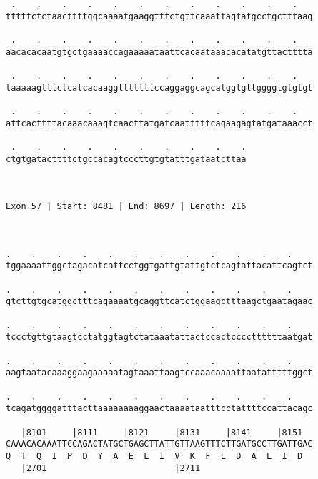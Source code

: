 \documentclass{article}
\begin{document}
\begin{Verbatim}
 .    .    .    .    .    .    .    .    .    .    .    .   
tttttctctaacttttggcaaaatgaaggtttctgttcaaattagtatgcctgctttaag
                                                            
 .    .    .    .    .    .    .    .    .    .    .    .   
aacacacaatgtgctgaaaaccagaaaaataattcacaataaacacatatgttactttta
                                                            
 .    .    .    .    .    .    .    .    .    .    .    .   
taaaaagtttctcatcacaaggtttttttccaggaggcagcatggtgttggggtgtgtgt
                                                            
 .    .    .    .    .    .    .    .    .    .    .    .   
attcacttttacaaacaaagtcaacttatgatcaatttttcagaagagtatgataaacct
                                                            
 .    .    .    .    .    .    .    .    .    .
ctgtgatacttttctgccacagtcccttgtgtatttgataatcttaa
                                               
                                               
 
Exon 57 | Start: 8481 | End: 8697 | Length: 216



.    .    .    .    .    .    .    .    .    .    .    .    
tggaaaattggctagacatcattcctggtgattgtattgtctcagtattacattcagtct
                                                            
.    .    .    .    .    .    .    .    .    .    .    .    
gtcttgtgcatggctttcagaaaatgcaggttcatctggaagctttaagctgaatagaac
                                                            
.    .    .    .    .    .    .    .    .    .    .    .    
tccctgttgtaagtcctatggtagtctataaatattactccactccccttttttaatgat
                                                            
.    .    .    .    .    .    .    .    .    .    .    .    
aagtaatacaaaggaagaaaaatagtaaattaagtccaaacaaaattaatatttttggct
                                                            
.    .    .    .    .    .    .    .    .    .    .    .    
tcagatggggatttacttaaaaaaaaggaactaaaataatttcctattttccattacagc
                                                            
   |8101     |8111     |8121     |8131     |8141     |8151  
CAAACACAAATTCCAGACTATGCTGAGCTTATTGTTAAGTTTCTTGATGCCTTGATTGAC
Q  T  Q  I  P  D  Y  A  E  L  I  V  K  F  L  D  A  L  I  D  
   |2701                         |2711                      
  

\end{Verbatim}
\end{document}
